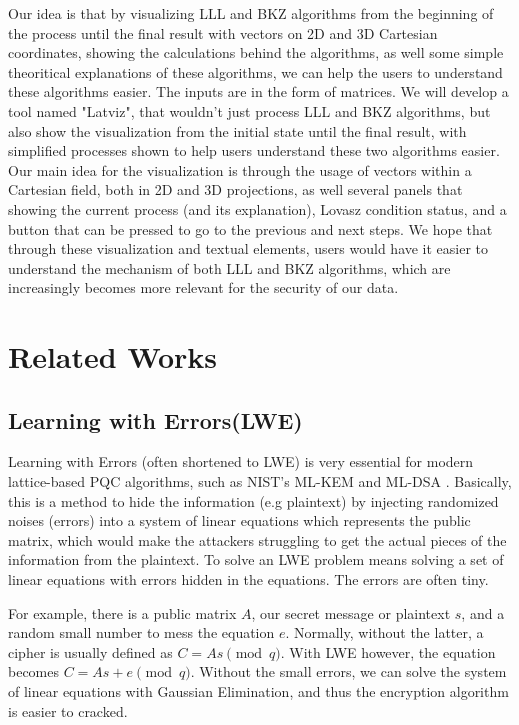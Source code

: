 \documentclass[runningheads]{llncs}
\begin{document}
Our idea is that by visualizing LLL and BKZ algorithms from the beginning of the process until the final result with vectors on 2D and 3D Cartesian coordinates, showing the calculations behind the algorithms, as well some simple theoritical explanations of these algorithms, we can help the users to understand these algorithms easier. The inputs are in the form of matrices. We will develop a tool named "Latviz", that wouldn't just process LLL and BKZ algorithms, but also show the visualization from the initial state until the final result, with simplified processes shown to help users understand these two algorithms easier. Our main idea for the visualization is through the usage of vectors within a Cartesian field, both in 2D and 3D projections, as well several panels that showing the current process (and its explanation), Lovasz condition status, and a button that can be pressed to go to the previous and next steps. We hope that through these visualization and textual elements, users would have it easier to understand the mechanism of both LLL and BKZ algorithms, which are increasingly becomes more relevant for the security of our data.


\section{Related Works}
\subsection{Learning with Errors(LWE)}
\mbox{}
Learning with Errors (often shortened to LWE) is very essential for modern lattice-based PQC algorithms, such as NIST's ML-KEM and ML-DSA \cite{11}. Basically, this is a method to hide the information (e.g plaintext) by injecting randomized noises (errors) into a system of linear equations which represents the public matrix, which would make the attackers struggling to get the actual pieces of the information from the plaintext. To solve an LWE problem means solving a set of linear equations with errors hidden in the equations. The errors are often tiny. 

For example, there is a public matrix $A$, our secret message or plaintext $s$, and a random small number to mess the equation $e$. Normally, without the latter, a cipher is usually defined as $C = As \pmod q$. With LWE however, the equation becomes $C = As + e \pmod q$. Without the small errors, we can solve the system of linear equations with Gaussian Elimination, and thus the encryption algorithm is easier to cracked. 
\end{document}
